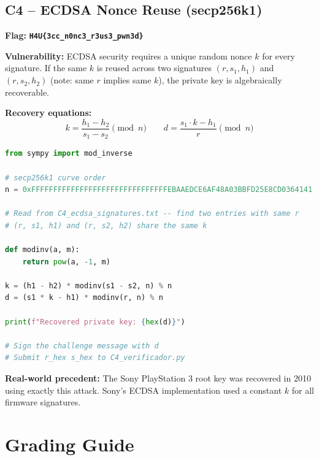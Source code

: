 \documentclass[a4paper, 12pt]{article}
\newcommand{\flag}[1]{\texttt{\color{flagcolor}\bfseries #1}}
\begin{document}
\subsection{C4 -- ECDSA Nonce Reuse (secp256k1)}

\textbf{Flag:} \flag{H4U\{3cc\_n0nc3\_r3us3\_pwn3d\}}

\textbf{Vulnerability:} ECDSA security requires a unique random nonce $k$ for
every signature. If the same $k$ is reused across two signatures $(r, s_1, h_1)$
and $(r, s_2, h_2)$ (note: same $r$ implies same $k$), the private key is
algebraically recoverable.

\textbf{Recovery equations:}
\[
k = \frac{h_1 - h_2}{s_1 - s_2} \pmod{n}
\qquad
d = \frac{s_1 \cdot k - h_1}{r} \pmod{n}
\]

\begin{lstlisting}[language=python]
from sympy import mod_inverse

# secp256k1 curve order
n = 0xFFFFFFFFFFFFFFFFFFFFFFFFFFFFFFFEBAAEDCE6AF48A03BBFD25E8CD0364141

# Read from C4_ecdsa_signatures.txt -- find two entries with same r
# (r, s1, h1) and (r, s2, h2) share the same k

def modinv(a, m):
    return pow(a, -1, m)

k = (h1 - h2) * modinv(s1 - s2, n) % n
d = (s1 * k - h1) * modinv(r, n) % n

print(f"Recovered private key: {hex(d)}")

# Sign the challenge message with d
# Submit r_hex s_hex to C4_verificador.py
\end{lstlisting}

\begin{mdframed}[backgroundcolor=labgray, linewidth=0.5pt]
\textbf{Real-world precedent:} The Sony PlayStation 3 root key was recovered
in 2010 using exactly this attack. Sony's ECDSA implementation used a constant
$k$ for all firmware signatures.
\end{mdframed}

\section{Grading Guide}
\end{document}

